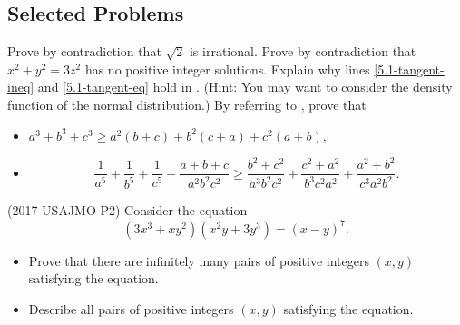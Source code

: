 \documentclass[../jarvis.tex]{subfiles}
\begin{document}
\subsection{Selected Problems}
\problem Prove by contradiction that $\sqrt{2}$ is irrational.
\problem* Prove by contradiction that $x^2+y^2=3z^2$ has no positive integer solutions.
\problem Explain why lines \eqref{5.1-tangent-ineq} and \eqref{5.1-tangent-eq} hold in .
(Hint: You may want to consider the density function of the normal distribution.)
\problem By referring to , prove that
\begin{itemize}
    \item $a^3+b^3+c^3\geq a^2(b+c)+b^2(c+a)+c^2(a+b),$
    \item \[\frac{1}{a^5}+\frac{1}{b^5}+\frac{1}{c^5}+\frac{a+b+c}{a^2b^2c^2}\geq \frac{b^2+c^2}{a^3b^2c^2}+\frac{c^2+a^2}{b^3c^2a^2}+\frac{a^2+b^2}{c^3a^2b^2}.\]
\end{itemize}
\problem (2017 USAJMO P2) Consider the equation $$(3x^3+xy^2)(x^2y+3y^3)=(x-y)^7.$$
\begin{itemize}
    \item Prove that there are infinitely many pairs of positive integers $(x,y)$ satisfying the equation.
    \item Describe all pairs of positive integers $(x,y)$ satisfying the equation.
\end{itemize}
\end{document}
